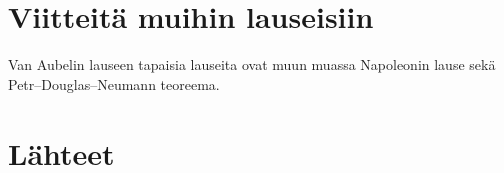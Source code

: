 \documentclass{scrartcl}
\begin{document}
\pagebreak
\section{Viitteitä muihin lauseisiin}

Van Aubelin lauseen tapaisia lauseita ovat muun muassa Napoleonin lause sekä \\Petr–Douglas–Neumann teoreema.


\pagebreak
\section{Lähteet}


\end{document}
